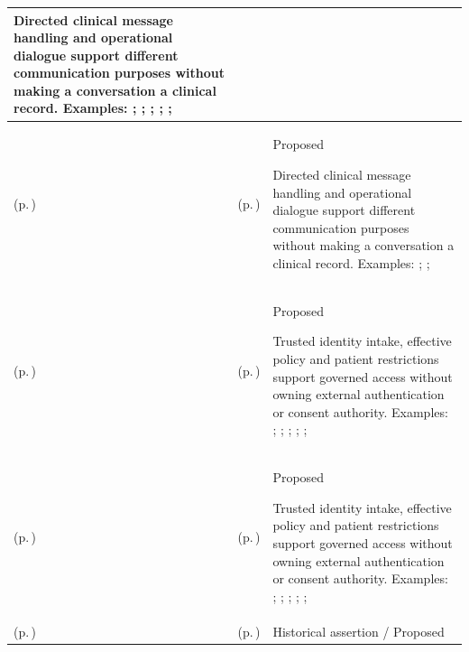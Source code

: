\begin{longtable}{|>{\raggedright\arraybackslash}p{0.27\TableWidth}|>{\raggedright\arraybackslash}p{0.27\TableWidth}|>{\raggedright\arraybackslash}p{0.46\TableWidth}|}
Directed clinical message handling and operational dialogue support different communication purposes without making a conversation a clinical record. Examples: \nameref{feature:feat-sa-27}; \nameref{feature:feat-sa-28}; \nameref{feature:feat-sa-29}; \nameref{function:distribute-clinical-communication}; \nameref{service:secure-clinical-message-dispatch}; \nameref{function:track-business-delivery-acknowledgement}\\\hline
\nameref{cap:bc-digital-communication-channel} (p.\,\pageref{cap:bc-digital-communication-channel}) & \nameref{cap:bec-general-collaboration} (p.\,\pageref{cap:bec-general-collaboration}) & Proposed

Directed clinical message handling and operational dialogue support different communication purposes without making a conversation a clinical record. Examples: \nameref{feature:feat-ise-19}; \nameref{function:coordinate-operational-collaboration}; \nameref{service:operational-collaboration-service}\\\hline
\nameref{cap:bc-digital-identity-access-governance} (p.\,\pageref{cap:bc-digital-identity-access-governance}) & \nameref{cap:bec-health-information-control} (p.\,\pageref{cap:bec-health-information-control}) & Proposed

Trusted identity intake, effective policy and patient restrictions support governed access without owning external authentication or consent authority. Examples: \nameref{feature:feat-ise-11}; \nameref{feature:feat-ise-12}; \nameref{feature:feat-ise-13}; \nameref{function:evaluate-information-access-authority}; \nameref{service:policy-evaluation-authorisation-service}; \nameref{function:evaluate-consent-constraint}\\\hline
\nameref{cap:bc-digital-identity-access-governance} (p.\,\pageref{cap:bc-digital-identity-access-governance}) & \nameref{cap:bec-client-privacy} (p.\,\pageref{cap:bec-client-privacy}) & Proposed

Trusted identity intake, effective policy and patient restrictions support governed access without owning external authentication or consent authority. Examples: \nameref{feature:feat-em-09}; \nameref{feature:feat-em-10}; \nameref{function:evaluate-client-consent}; \nameref{service:consent-decision-service}; \nameref{function:evaluate-client-confidentiality-restrictions}; \nameref{service:confidentiality-restriction-evaluation}\\\hline
\nameref{cap:bc-digital-accountability-trust} (p.\,\pageref{cap:bc-digital-accountability-trust}) & \nameref{cap:bec-significant-activity-audit-capture} (p.\,\pageref{cap:bec-significant-activity-audit-capture}) & Historical assertion / Proposed


\end{longtable}

